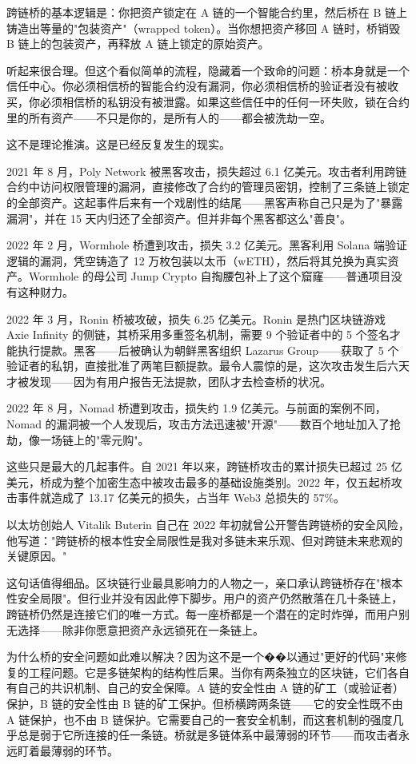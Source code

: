 \documentclass[a4paper,12pt,openany]{ctexbook}
\begin{document}
跨链桥的基本逻辑是：你把资产锁定在 A 链的一个智能合约里，然后桥在 B 链上铸造出等量的"包装资产"（wrapped token）。当你想把资产移回 A 链时，桥销毁 B 链上的包装资产，再释放 A 链上锁定的原始资产。

听起来很合理。但这个看似简单的流程，隐藏着一个致命的问题：桥本身就是一个信任中心。你必须相信桥的智能合约没有漏洞，你必须相信桥的验证者没有被收买，你必须相信桥的私钥没有被泄露。如果这些信任中的任何一环失败，锁在合约里的所有资产——不只是你的，是所有人的——都会被洗劫一空。

这不是理论推演。这是已经反复发生的现实。

2021 年 8 月，Poly Network 被黑客攻击，损失超过 6.1 亿美元。攻击者利用跨链合约中访问权限管理的漏洞，直接修改了合约的管理员密钥，控制了三条链上锁定的全部资产。这起事件后来有一个戏剧性的结尾——黑客声称自己只是为了"暴露漏洞"，并在 15 天内归还了全部资产。但并非每个黑客都这么"善良"。

2022 年 2 月，Wormhole 桥遭到攻击，损失 3.2 亿美元。黑客利用 Solana 端验证逻辑的漏洞，凭空铸造了 12 万枚包装以太币（wETH），然后将其兑换为真实资产。Wormhole 的母公司 Jump Crypto 自掏腰包补上了这个窟窿——普通项目没有这种财力。

2022 年 3 月，Ronin 桥被攻破，损失 6.25 亿美元。Ronin 是热门区块链游戏 Axie Infinity 的侧链，其桥采用多重签名机制，需要 9 个验证者中的 5 个签名才能执行提款。黑客——后被确认为朝鲜黑客组织 Lazarus Group——获取了 5 个验证者的私钥，直接批准了两笔巨额提款。最令人震惊的是，这次攻击发生后六天才被发现——因为有用户报告无法提款，团队才去检查桥的状况。

2022 年 8 月，Nomad 桥遭到攻击，损失约 1.9 亿美元。与前面的案例不同，Nomad 的漏洞被一个人发现后，攻击方法迅速被"开源"——数百个地址加入了抢劫，像一场链上的"零元购"。

这些只是最大的几起事件。自 2021 年以来，跨链桥攻击的累计损失已超过 25 亿美元，桥成为整个加密生态中被攻击最多的基础设施类别。2022 年，仅五起桥攻击事件就造成了 13.17 亿美元的损失，占当年 Web3 总损失的 57\%。

以太坊创始人 Vitalik Buterin 自己在 2022 年初就曾公开警告跨链桥的安全风险，他写道："跨链桥的根本性安全局限性是我对多链未来乐观、但对跨链未来悲观的关键原因。"

这句话值得细品。区块链行业最具影响力的人物之一，亲口承认跨链桥存在"根本性安全局限"。但行业并没有因此停下脚步。用户的资产仍然散落在几十条链上，跨链桥仍然是连接它们的唯一方式。每一座桥都是一个潜在的定时炸弹，而用户别无选择——除非你愿意把资产永远锁死在一条链上。

为什么桥的安全问题如此难以解决？因为这不是一个��以通过"更好的代码"来修复的工程问题。它是多链架构的结构性后果。当你有两条独立的区块链，它们各自有自己的共识机制、自己的安全保障。A 链的安全性由 A 链的矿工（或验证者）保护，B 链的安全性由 B 链的矿工保护。但桥横跨两条链——它的安全性既不由 A 链保护，也不由 B 链保护。它需要自己的一套安全机制，而这套机制的强度几乎总是弱于它所连接的任一条链。桥就是多链体系中最薄弱的环节——而攻击者永远盯着最薄弱的环节。
\end{document}
